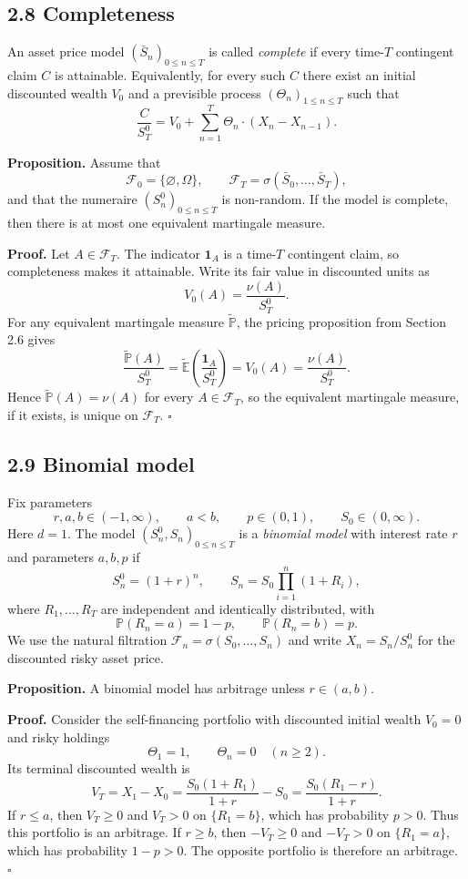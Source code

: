 \documentclass[11pt,a4paper]{article}
\begin{document}
\subsection*{2.8 Completeness}

An asset price model $(\bar S_n)_{0\leq n\leq T}$ is called
\emph{complete} if every time-$T$ contingent claim $C$ is attainable.
Equivalently, for every such $C$ there exist an initial discounted
wealth $V_0$ and a previsible process $(\Theta_n)_{1\leq n\leq T}$
such that
\[
\frac{C}{S_T^0}
=V_0+\sum_{n=1}^T\Theta_n\cdot(X_n-X_{n-1}).
\]

\medskip
\noindent\textbf{Proposition.}
Assume that
\[
\mathcal F_0=\{\varnothing,\Omega\},\qquad
\mathcal F_T=\sigma(\bar S_0,\ldots,\bar S_T),
\]
and that the numeraire $(S_n^0)_{0\leq n\leq T}$ is non-random.
If the model is complete, then there is at most one equivalent
martingale measure.

\noindent\textbf{Proof.}
Let $A\in\mathcal F_T$. The indicator $\mathbf1_A$ is a time-$T$
contingent claim, so completeness makes it attainable. Write its
fair value in discounted units as
\[
V_0(A)=\frac{\nu(A)}{S_T^0}.
\]
For any equivalent martingale measure $\widetilde{\mathbb P}$, the
pricing proposition from Section 2.6 gives
\[
\frac{\widetilde{\mathbb P}(A)}{S_T^0}
=\widetilde{\mathbb E}\!\left(\frac{\mathbf1_A}{S_T^0}\right)
=V_0(A)=\frac{\nu(A)}{S_T^0}.
\]
Hence $\widetilde{\mathbb P}(A)=\nu(A)$ for every $A\in\mathcal F_T$,
so the equivalent martingale measure, if it exists, is unique on
$\mathcal F_T$.
\hfill$\square$

\subsection*{2.9 Binomial model}

Fix parameters
\[
r,a,b\in(-1,\infty),\qquad a<b,\qquad
p\in(0,1),\qquad S_0\in(0,\infty).
\]
Here $d=1$. The model $(S_n^0,S_n)_{0\leq n\leq T}$ is a
\emph{binomial model} with interest rate $r$ and parameters $a,b,p$ if
\[
S_n^0=(1+r)^n,\qquad
S_n=S_0\prod_{i=1}^n(1+R_i),
\]
where $R_1,\ldots,R_T$ are independent and identically distributed,
with
\[
\mathbb P(R_n=a)=1-p,\qquad \mathbb P(R_n=b)=p.
\]
We use the natural filtration
$\mathcal F_n=\sigma(S_0,\ldots,S_n)$ and write
$X_n=S_n/S_n^0$ for the discounted risky asset price.

\medskip
\noindent\textbf{Proposition.}
A binomial model has arbitrage unless $r\in(a,b)$.

\noindent\textbf{Proof.}
Consider the self-financing portfolio with discounted initial wealth
$V_0=0$ and risky holdings
\[
\Theta_1=1,\qquad \Theta_n=0\quad(n\geq2).
\]
Its terminal discounted wealth is
\[
V_T=X_1-X_0
=\frac{S_0(1+R_1)}{1+r}-S_0
=\frac{S_0(R_1-r)}{1+r}.
\]
If $r\leq a$, then $V_T\geq0$ and $V_T>0$ on $\{R_1=b\}$,
which has probability $p>0$. Thus this portfolio is an arbitrage.
If $r\geq b$, then $-V_T\geq0$ and $-V_T>0$ on $\{R_1=a\}$,
which has probability $1-p>0$. The opposite portfolio is therefore
an arbitrage.
\hfill$\square$
\end{document}
